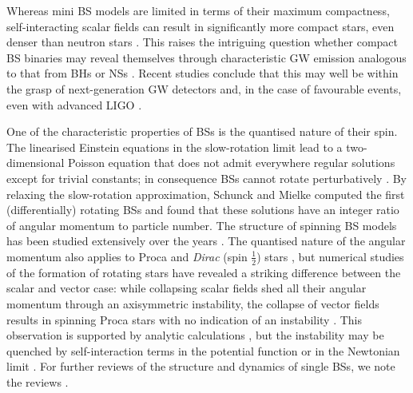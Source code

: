 \documentclass[]{iopart}
\begin{document}
Whereas mini BS models are limited in terms of their maximum
compactness, self-interacting scalar fields
can result in significantly more compact stars, even
denser than neutron stars
\cite{Colpi:1986ye,Lee:1986ts,Schunck:1999zu,Hartmann:2012da}. This raises the intriguing
question whether compact BS binaries may reveal themselves
through characteristic GW emission analogous to that from
BHs or NSs \cite{Bustillo:2020syj}. Recent studies
conclude that this may well be within the grasp of
next-generation GW detectors and, in the case of favourable
events, even with advanced LIGO
\cite{Sennett:2017etc,DiGiovanni:2020ror,Toubiana:2020lzd}.

One of the characteristic properties of BSs is
the quantised nature of their spin. The linearised
Einstein equations in the slow-rotation limit lead
to a two-dimensional Poisson equation that does not
admit everywhere regular solutions except for trivial
constants; in consequence BSs cannot rotate perturbatively
\cite{Kobayashi:1994qi}. By relaxing the slow-rotation
approximation, Schunck and Mielke \cite{Schunck:1996he}
computed the first (differentially) rotating BSs
and found that these solutions have an integer
ratio of angular momentum to particle number. The
structure of spinning BS models has been studied extensively
over the years \cite{Ryan:1996nk,Yoshida:1997jq,Yoshida:1997qf,Yoshida:1997nd,Schunck:1999pm,Kleihaus:2005me,Kleihaus:2007vk,Kleihaus:2011sx,Collodel:2017biu}. The quantised nature
of the angular momentum also applies to Proca and
{\it Dirac} (spin $\tfrac{1}{2}$) stars
\cite{Herdeiro:2019mbz}, but numerical studies of the formation
of rotating stars have revealed a striking difference
between the scalar and vector case: while collapsing
scalar fields shed all their angular momentum through an
axisymmetric instability, the collapse of vector fields
results in spinning Proca stars with no indication of an
instability \cite{Sanchis-Gual:2019ljs,DiGiovanni:2020ror}.
This observation is supported by analytic calculations
\cite{Dmitriev:2021utv}, but the instability
may be quenched by self-interaction
terms in the potential function or in the Newtonian limit
\cite{Siemonsen:2020hcg}.
For further reviews of the structure and dynamics of single BSs,
we note the reviews
\cite{Mielke:1997re,Mielke:2000mh,Mundim:2010hi,Liebling:2012fv}.
\end{document}
